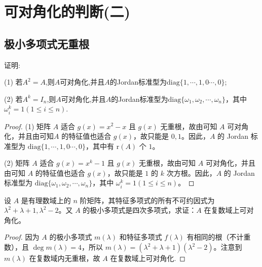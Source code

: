 \documentclass[../../main.tex]{subfiles}%
\begin{document}
\section{可对角化的判断(二)}

\subsection{极小多项式无重根}

\begin{proposition}\label{example:幂等和对合矩阵的Jordan标准型}
证明:

(1) 若$A^2 = A$,则$A$可对角化,并且$A$的Jordan标准型为$\mathrm{diag}\{1,\cdots,1,0\cdots,0\}$;

(2) 若$A^k = I_n$,则$A$可对角化,并且$A$的Jordan标准型为$\mathrm{diag}\{\omega_1,\omega_2,\cdots,\omega_n\}$，其中 $\omega_i^k = 1 (1\leqslant  i\leqslant  n)$.
\end{proposition}
\begin{proof}

(1) 矩阵 $A$ 适合 $g(x)=x^2 - x$ 且 $g(x)$ 无重根，故由可知 $A$ 可对角化，并且由可知$A$ 的特征值也适合 $g(x)$，故只能是 $0,1$。因此，$A$ 的 Jordan 标准型为 $\mathrm{diag}\{1,\cdots,1,0\cdots,0\}$，其中有 $\mathrm{r}(A)$ 个 $1$。

(2) 矩阵 $A$ 适合 $g(x)=x^k - 1$ 且 $g(x)$ 无重根，故由可知 $A$ 可对角化，并且由可知 $A$ 的特征值也适合 $g(x)$，故只能是 $1$ 的 $k$ 次方根。因此，$A$ 的 Jordan 标准型为 $\mathrm{diag}\{\omega_1,\omega_2,\cdots,\omega_n\}$，其中 $\omega_i^k = 1 (1\leqslant  i\leqslant  n)$。

\end{proof}

\begin{example}
设 $A$ 是有理数域上的 $n$ 阶矩阵，其特征多项式的所有不可约因式为 $\lambda^2 + \lambda + 1,\lambda^2 - 2$。又 $A$ 的极小多项式是四次多项式，求证：$A$ 在复数域上可对角化。
\end{example}
\begin{proof}

因为 $A$ 的极小多项式 $m(\lambda)$ 和特征多项式 $f(\lambda)$ 有相同的根（不计重数），且 $\deg m(\lambda)=4$，所以 $m(\lambda)=(\lambda^2 + \lambda + 1)(\lambda^2 - 2)$。注意到 $m(\lambda)$ 在复数域内无重根，故 $A$ 在复数域上可对角化.

\end{proof}
\end{document}
